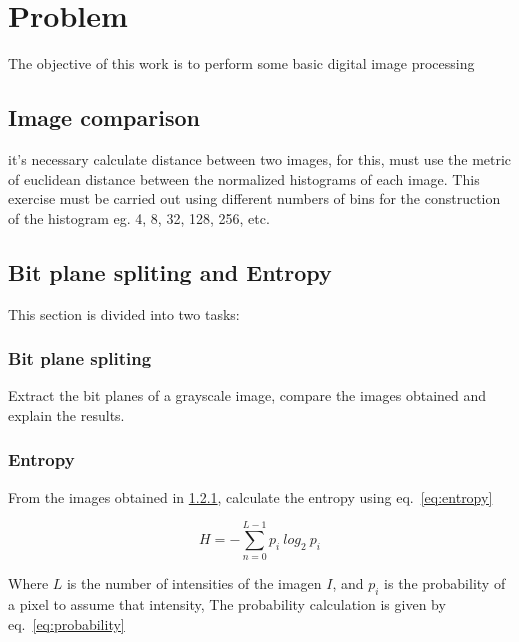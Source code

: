 \documentclass[journal]{IEEEtran}
\begin{document}




\maketitle

\section{Problem}
\label{sec:sec_1}
The objective of this work is to perform some basic digital image processing

\subsection{Image comparison}
it's necessary calculate distance between two images, for this, must use the metric of euclidean distance between the normalized histograms of each image. This exercise must be carried out using different numbers of bins for the construction of the histogram eg. 4, 8, 32, 128, 256, etc.

\subsection{Bit plane spliting and Entropy}

This section is divided into two tasks:

\subsubsection{Bit plane spliting}
\label{sec:bit-plane-slicing}
Extract the bit planes of a grayscale image, compare the images obtained and explain the results.
\subsubsection{Entropy}
From the images obtained in \ref{sec:bit-plane-slicing}, calculate the entropy using eq.~\ref{eq:entropy}

\begin{equation}
\label{eq:entropy}
H =   -\sum_{n=0}^{L-1} p_i~log_2~p_i
\end{equation}

Where $L$ is the number of intensities of the imagen $I$, and $p_i$ is the probability of a pixel to assume that intensity, The probability calculation is given by eq.~\ref{eq:probability}
\end{document}
